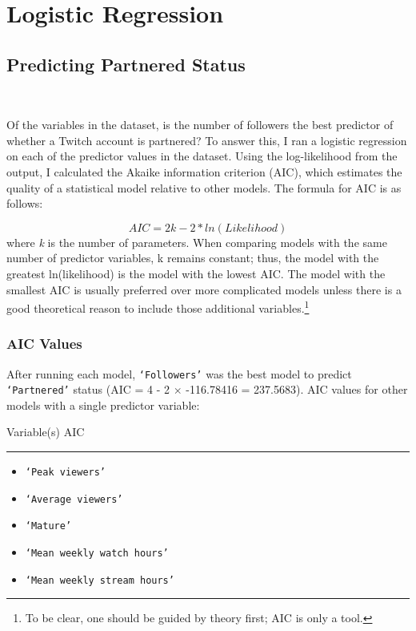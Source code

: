 \documentclass[12pt]{article}
\begin{document}
\section{Logistic Regression}

\subsection{Predicting Partnered Status}\

Of the variables in the dataset, is the number of followers the best predictor of whether a Twitch account is partnered? To answer this, I ran a logistic regression on each of the predictor values in the dataset. Using the log-likelihood from the output, I calculated the Akaike information criterion (AIC), which estimates the quality of a statistical model relative to other models. The formula for AIC is as follows:

\begin{equation}
AIC = 2k -2 \ast ln(Likelihood)
\end{equation}
where \emph{k} is the number of parameters. When comparing models with the same number of predictor variables, k remains constant; thus, the model with the greatest ln(likelihood) is the model with the lowest AIC. The model with the smallest AIC is usually preferred over more complicated models unless there is a good theoretical reason to include those additional variables.\footnote{To be clear, one should be guided by theory first; AIC is only a tool.}

\subsubsection{AIC Values}

After running each model, \texttt{`Followers'} was the best model to predict \texttt{`Partnered'} status (AIC = 4 - 2 $\times$ -116.78416 = 237.5683).
\newline
\newline
\noindent AIC values for other models with a single predictor variable:

\noindent Variable(s) \hfill AIC 
\hspace{0.4em}
\hrule
\begin{itemize}
	\item \texttt{`Peak viewers'} 
	\item \texttt{`Average viewers'} 
	\item \texttt{`Mature'} 
	\item \texttt{`Mean weekly watch hours'} 
	\item \texttt{`Mean weekly stream hours'} 
\end{itemize}
\end{document}
